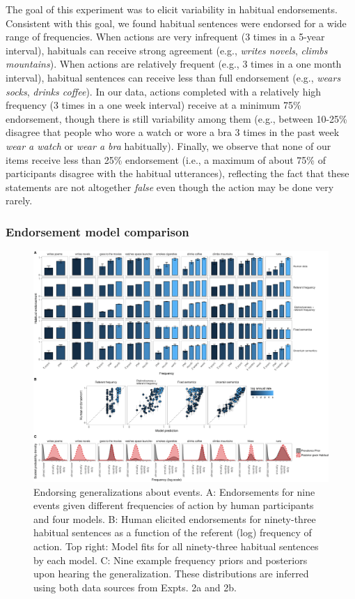 \documentclass[english,,man,floatsintext]{apa6}
\theoremstyle{definition}
\theoremstyle{definition}
\theoremstyle{definition}
\theoremstyle{remark}
\begin{document}
The goal of this experiment was to elicit variability in habitual
endorsements. Consistent with this goal, we found habitual sentences
were endorsed for a wide range of frequencies. When actions are very
infrequent (3 times in a 5-year interval), habituals can receive strong
agreement (e.g., \emph{writes novels}, \emph{climbs mountains}). When
actions are relatively frequent (e.g., 3 times in a one month interval),
habitual sentences can receive less than full endorsement (e.g.,
\emph{wears socks}, \emph{drinks coffee}). In our data, actions
completed with a relatively high frequency (3 times in a one week
interval) receive at a minimum 75\% endorsement, though there is still
variability among them (e.g., between 10-25\% disagree that people who
wore a watch or wore a bra 3 times in the past week \emph{wear a watch}
or \emph{wear a bra} habitually). Finally, we observe that none of our
items receive less than 25\% endorsement (i.e., a maximum of about 75\%
of participants disagree with the habitual utterances), reflecting the
fact that these statements are not altogether \emph{false} even though
the action may be done very rarely.

\hypertarget{endorsement-model-comparison-1}{%
\subsubsection{Endorsement model
comparison}\label{endorsement-model-comparison-1}}

\begin{figure}[!h]
\includegraphics[width=\textwidth]{figs/habituals-endorsement-figure-1} \caption{Endorsing generalizations about events. A: Endorsements for nine events given different frequencies of action by human participants and four models. B: Human elicited endorsements for ninety-three habitual sentences as a function of the referent (log) frequency of action. Top right: Model fits for all ninety-three habitual sentences by each model. C: Nine example frequency priors and posteriors upon hearing the generalization. These distributions are inferred using both data sources from Expts. 2a and 2b.}\label{fig:habituals-endorsement-figure}
\end{figure}
\end{document}
